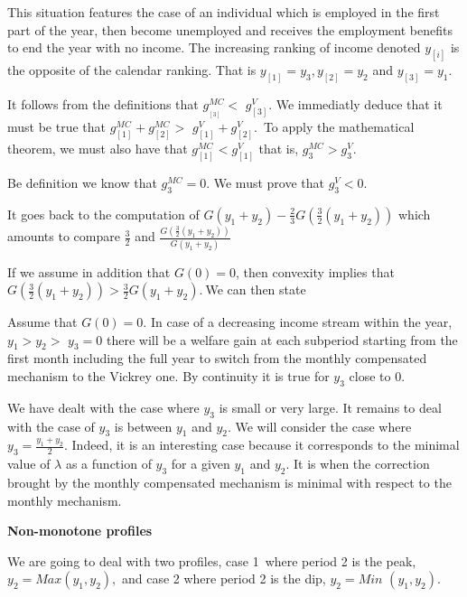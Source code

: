 This situation features the case of an individual which is employed in the
first part of the year, then become unemployed and receives the employment
benefits to end the year with no income. The increasing ranking of income
denoted $y_{\left[  i\right]  }$ is the opposite of the calendar ranking. That
is $y_{\left[  1\right]  }=y_{3},y_{\left[  2\right]  }=y_{2}$ and $y_{\left[
3\right]  }=y_{1}.$

It follows from the definitions that $g_{_{\left[  3\right]  }}^{MC}<$
$g_{\left[  3\right]  }^{V}$. We immediatly deduce that it must be true that
$g_{\left[  1\right]  }^{MC}+g_{\left[  2\right]  }^{MC}>$ $g_{\left[
1\right]  }^{V}+g_{\left[  2\right]  }^{V}$.\ To apply the mathematical
theorem, we must also have that $g_{\left[  1\right]  }^{MC}<g_{\left[
1\right]  }^{V}$ that is, $g_{3}^{MC}>g_{3}^{V}.$

Be definition we know that $g_{3}^{MC}=0.$ We must prove that $g_{3}^{V}<0.$

It goes back to the computation of $G(y_{1}+y_{2})-\frac{2}{3}G(\frac{3}%
{2}(y_{1}+y_{2}))$ which amounts to compare $\frac{3}{2}$ and $\frac
{G(\frac{3}{2}(y_{1}+y_{2}))}{G(y_{1}+y_{2})}$

If we assume in addition that $G(0)=0$, then convexity implies that
$G(\frac{3}{2}(y_{1}+y_{2}))>\frac{3}{2}G(y_{1}+y_{2}).\ $We can then state


\begin{claim}
Assume that $G(0)=0.$ In case of a decreasing income stream within the year, \hfill
$y_{1}>y_{2}>$ $y_{3}=0$ there will be a welfare gain at each subperiod
starting from the first month including the full year to switch from the
monthly compensated mechanism to the Vickrey one. By continuity it is true for
$y_{3}$ close to $0.$
\end{claim}


We have dealt with the case where $y_{3}$ is small or very large. It remains
to deal with the case of $y_{3}$ is between $y_{1}$ and $y_{2}.$ We will
consider the case where $y_{3}=\frac{y_{1}+y_{2}}{2}.$ Indeed, it is an
interesting case because it corresponds to the minimal value of $\lambda$ as a
function of $y_{3}$ for a given $y_{1}$ and $y_{2}$. It is when the correction
brought by the monthly compensated mechanism is minimal with respect to the
monthly mechanism.
\medskip

\textbf{Non-monotone profiles}

We are going to deal with two profiles, case 1\ where period 2 is the peak,
$y_{2}=Max(y_{1},y_{2}),$ and case 2 where period 2 is the dip, $y_{2}=Min$
$(y_{1},y_{2}).$

